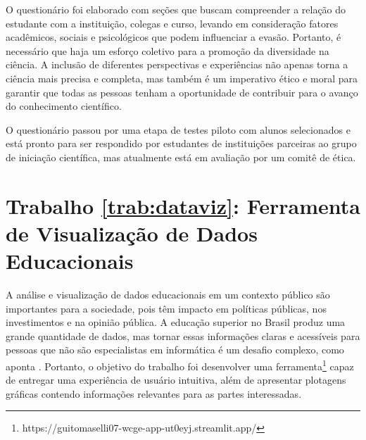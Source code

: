 \documentclass[12pt]{article}
\begin{document}
O questionário foi elaborado com seções que buscam compreender a relação do estudante com a instituição, colegas e curso, levando em consideração fatores acadêmicos, sociais e psicológicos que podem influenciar a evasão. Portanto, é necessário que haja um esforço coletivo para a promoção da diversidade na ciência. A inclusão de diferentes perspectivas e experiências não apenas torna a ciência mais precisa e completa, mas também é um imperativo ético e moral para garantir que todas as pessoas tenham a oportunidade de contribuir para o avanço do conhecimento científico.

O questionário passou por uma etapa de testes piloto com alunos selecionados e está pronto para ser respondido por estudantes de instituições parceiras ao grupo de iniciação científica, mas atualmente está em avaliação por um comitê de ética.

\section{Trabalho \ref{trab:dataviz}: Ferramenta de Visualização de Dados Educacionais}
\label{sec:visualizacao}

A análise e visualização de dados educacionais em um contexto público são importantes para a sociedade, pois têm impacto em políticas públicas, nos investimentos e na opinião pública. A educação superior no Brasil produz uma grande quantidade de dados, mas tornar essas informações claras e acessíveis para pessoas que não são especialistas em informática é um desafio complexo, como aponta \cite{marx:2013}. Portanto, o objetivo do trabalho foi desenvolver uma ferramenta\footnote{https://guitomaselli07-wcge-app-ut0eyj.streamlit.app/} capaz de entregar uma experiência de usuário intuitiva, além de apresentar plotagens gráficas contendo informações relevantes para as partes interessadas. 

\end{document}

